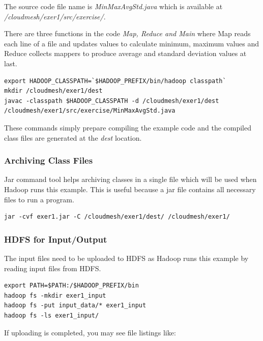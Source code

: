 The source code file name is \textit{MinMaxAvgStd.java} which is
available at \textit{/cloudmesh/exer1/src/exercise/}.

There are three functions in the code \textit{Map, Reduce and Main}
where Map reads each line of a file and updates values to calculate
minimum, maximum values and Reduce collects mappers to produce average
and standard deviation values at last.

\begin{lstlisting}
export HADOOP_CLASSPATH=`$HADOOP_PREFIX/bin/hadoop classpath`
mkdir /cloudmesh/exer1/dest
javac -classpath $HADOOP_CLASSPATH -d /cloudmesh/exer1/dest /cloudmesh/exer1/src/exercise/MinMaxAvgStd.java
\end{lstlisting}

These commands simply prepare compiling the example code and the
compiled class files are generated at the \textit{dest} location.

\subsubsection{Archiving Class Files}

Jar command tool helps archiving classes in a single file which will be used
when Hadoop runs this example. This is useful because a jar file contains all
necessary files to run a program.

\begin{lstlisting}
jar -cvf exer1.jar -C /cloudmesh/exer1/dest/ /cloudmesh/exer1/
\end{lstlisting}

\subsubsection{HDFS for Input/Output}

The input files need to be uploaded to HDFS as Hadoop runs this example by
reading input files from HDFS.

\begin{lstlisting}
export PATH=$PATH:/$HADOOP_PREFIX/bin
hadoop fs -mkdir exer1_input
hadoop fs -put input_data/* exer1_input
hadoop fs -ls exer1_input/
\end{lstlisting}

If uploading is completed, you may see file listings like:


